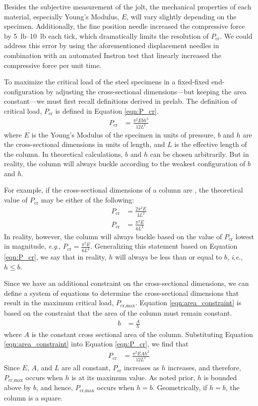 \documentclass[12 pt]{article}
\newcommand{\ie}{\textit{i}.\textit{e}., }
\newcommand{\eg}{\textit{e}.\textit{g}., }
\begin{document}
Besides the subjective measurement of the jolt, the mechanical properties of each material, especially Young's Modulus, $E$, will vary slightly depending on the specimen. Additionally, the fine position needle increased the compressive force by \qtyrange{5}{10}{lb} each tick, which dramatically limits the resolution of $P_\text{cr}$. We could address this error by using the aforementioned displacement needles in combination with an automated Instron test that linearly increased the compressive force per unit time.

To maximize the critical load of the steel specimens in a fixed-fixed end-configuration by adjusting the cross-sectional dimensions---but keeping the area constant---we must first recall definitions derived in prelab. The definition of critical load, $P_\text{cr}$ is defined in Equation \ref{eqn:P_cr}.
\begin{align}
	P_\text{cr}&=\frac{\pi^2Ebh^3}{12L^2}\label{eqn:P_cr}
\end{align}
where $E$ is the Young's Modulus of the specimen in units of pressure, $b$ and $h$ are the cross-sectional dimensions in units of length, and $L$ is the effective length of the column. In theoretical calculations, $b$ and $h$ can be chosen arbitrarily. But in reality, the column will always buckle according to the weakest configuration of $b$ and $h$.

For example, if the cross-sectional dimensions of a column are , the theoretical value of $P_\text{cr}$ may be either of the following:
\begin{align*}
	P_\text{cr}&=\frac{2\pi^2E}{3L^2}\\
	P_\text{cr}&=\frac{\pi^2E}{6L^2}
\end{align*}
In reality, however, the column will always buckle based on the value of $P_\text{cr}$ lowest in magnitude, \eg $P_\text{cr}=\frac{\pi^2E}{6L^2}$. Generalizing this statement based on Equation \ref{eqn:P_cr}, we say that in reality, $h$ will always be less than or equal to $b$, \ie $h\le{}b$.

Since we have an additional constraint on the cross-sectional dimensions, we can define a system of equations to determine the cross-sectional dimensions that result in the maximum critical load, $P_\text{cr,max}$. Equation \ref{eqn:area_constraint} is based on the constraint that the area of the column must remain constant.
\begin{align}
	b&=\frac{A}{h}\label{eqn:area_constraint}
\end{align}
where $A$ is the constant cross sectional area of the column. Substituting Equation \ref{eqn:area_constraint} into Equation \ref{eqn:P_cr}, we find that
\begin{align}
	P_\text{cr}&=\frac{\pi^2EAh^2}{12L^2}\label{eqn:subsituted_P_cr}
\end{align}
Since $E$, $A$, and $L$ are all constant, $P_\text{cr}$ increases as $h$ increases, and therefore, $P_\text{cr,max}$ occurs when $h$ is at its maximum value. As noted prior, $h$ is bounded above by $b$, and hence, $P_\text{cr,max}$ occurs when $h=b$. Geometrically, if $h=b$, the column is a square.
\end{document}
